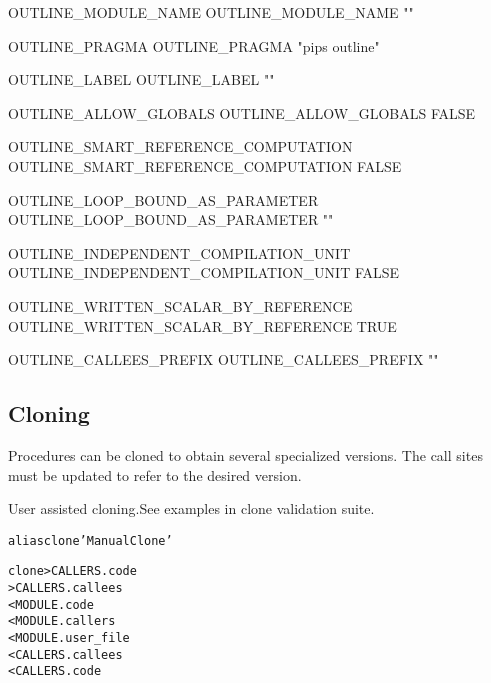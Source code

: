 \documentclass[a4paper]{report}
\newenvironment{PipsMake}{\begin{alltt}}{\end{alltt}}
\newenvironment{PipsPass}[1]{\label{pass:#1}}{}
\begin{document}
\begin{PipsProp}{OUTLINE_MODULE_NAME}
OUTLINE_MODULE_NAME ""
\end{PipsProp}
\begin{PipsProp}{OUTLINE_PRAGMA}
OUTLINE_PRAGMA "pips outline"
\end{PipsProp}
\begin{PipsProp}{OUTLINE_LABEL}
OUTLINE_LABEL ""
\end{PipsProp}
\begin{PipsProp}{OUTLINE_ALLOW_GLOBALS}
OUTLINE_ALLOW_GLOBALS FALSE
\end{PipsProp}
\begin{PipsProp}{OUTLINE_SMART_REFERENCE_COMPUTATION}
OUTLINE_SMART_REFERENCE_COMPUTATION FALSE
\end{PipsProp}
\begin{PipsProp}{OUTLINE_LOOP_BOUND_AS_PARAMETER}
OUTLINE_LOOP_BOUND_AS_PARAMETER ""
\end{PipsProp}
\begin{PipsProp}{OUTLINE_INDEPENDENT_COMPILATION_UNIT}
OUTLINE_INDEPENDENT_COMPILATION_UNIT FALSE
\end{PipsProp}
\begin{PipsProp}{OUTLINE_WRITTEN_SCALAR_BY_REFERENCE}
OUTLINE_WRITTEN_SCALAR_BY_REFERENCE TRUE
\end{PipsProp}
\begin{PipsProp}{OUTLINE_CALLEES_PREFIX}
OUTLINE_CALLEES_PREFIX ""
\end{PipsProp}


\subsection{Cloning}

\begin{PipsPass}{clone}
Procedures can be cloned to obtain several specialized versions. The
call sites must be updated to refer to the desired version.

User assisted cloning.See examples in clone validation
suite. 
\end{PipsPass}

\begin{PipsMake}

alias clone 'Manual Clone'

clone                   > CALLERS.code
                        > CALLERS.callees
        < MODULE.code
        < MODULE.callers
        < MODULE.user_file
        < CALLERS.callees
        < CALLERS.code
\end{PipsMake}
\end{document}
